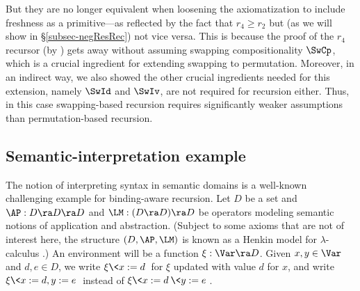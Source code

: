  But they are no longer equivalent when loosening the axiomatization to include freshness as a primitive---as reflected by the fact that $r_4 \geq r_2$ but (as we will show in \S\ref{subsec-negResRec}) not vice versa.  This is because the %
 proof of the $r_4$ recursor (by %
 \citet{primrecFOAS-Norrish04}) gets away without assuming swapping compositionality $\SwCp$, which is a crucial ingredient for extending swapping to permutation. Moreover, in an indirect way, we also showed the other crucial ingredients needed for this extension, namely $\SwId$ and $\SwIv$, are not required for recursion either. 
 Thus, in this case swapping-based recursion requires significantly weaker 
 assumptions   
 than permutation-based recursion.  
%
{}



\vspace*{-0.5ex}\subsection{Semantic-interpretation example}
\label{subsec-semInt}


The notion of interpreting syntax in semantic domains is a well-known challenging example for binding-aware recursion. 
%
%
%
Let $D$ be a set and $\AP : D \ra D \ra D$ 
and $\LM: (D \ra D) \ra D$ be operators modeling semantic notions of application and abstraction. 
(Subject to some axioms that are not of interest here, the structure $(D,\AP,\LM)$ is known as a Henkin model for $\lambda$-calculus \cite{bar-lam}.) %
An environment will be a function $\xi: \Var \ra D$. 
Given $x,y\in\Var$ and $d,e\in D$, we write $\xi\<x:=d\>$ for $\xi$ updated with value $d$ for $x$, 
and write $\xi\<x:=d,y:=e\>$ instead of $\xi\<x:=d\>\<y:=e\>$. 

